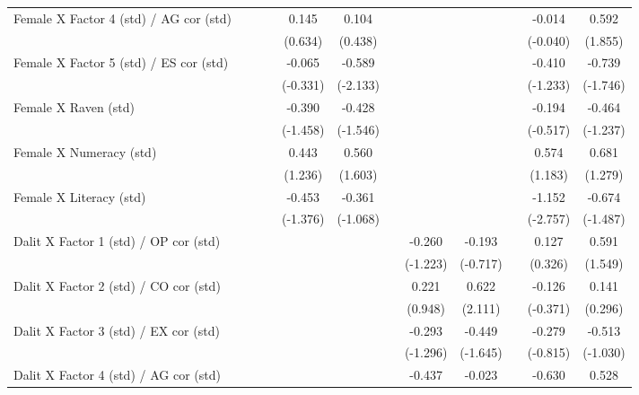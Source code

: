 {\begin{longtable}{@{\extracolsep{\fill}}lccccccccccc}
    Female X Factor 4 (std) / AG cor (std) &       &       &       & 0.145 & 0.104 &       &       &       &       & -0.014 & 0.592 \\
          &       &       &       & (0.634) & (0.438) &       &       &       &       & (-0.040) & (1.855) \\
    Female X Factor 5 (std) / ES cor (std) &       &       &       & -0.065 & -0.589 &       &       &       &       & -0.410 & -0.739 \\
          &       &       &       & (-0.331) & (-2.133) &       &       &       &       & (-1.233) & (-1.746) \\
    Female X Raven (std) &       &       &       & -0.390 & -0.428 &       &       &       &       & -0.194 & -0.464 \\
          &       &       &       & (-1.458) & (-1.546) &       &       &       &       & (-0.517) & (-1.237) \\
    Female X Numeracy (std) &       &       &       & 0.443 & 0.560 &       &       &       &       & 0.574 & 0.681 \\
          &       &       &       & (1.236) & (1.603) &       &       &       &       & (1.183) & (1.279) \\
    Female X Literacy (std) &       &       &       & -0.453 & -0.361 &       &       &       &       & -1.152 & -0.674 \\
          &       &       &       & (-1.376) & (-1.068) &       &       &       &       & (-2.757) & (-1.487) \\
    Dalit X Factor 1 (std) / OP cor (std) &       &       &       &       &       &       & -0.260 & -0.193 &       & 0.127 & 0.591 \\
          &       &       &       &       &       &       & (-1.223) & (-0.717) &       & (0.326) & (1.549) \\
    Dalit X Factor 2 (std) / CO cor (std) &       &       &       &       &       &       & 0.221 & 0.622 &       & -0.126 & 0.141 \\
          &       &       &       &       &       &       & (0.948) & (2.111) &       & (-0.371) & (0.296) \\
    Dalit X Factor 3 (std) / EX cor (std) &       &       &       &       &       &       & -0.293 & -0.449 &       & -0.279 & -0.513 \\
          &       &       &       &       &       &       & (-1.296) & (-1.645) &       & (-0.815) & (-1.030) \\
    Dalit X Factor 4 (std) / AG cor (std) &       &       &       &       &       &       & -0.437 & -0.023 &       & -0.630 & 0.528 \\

\end{longtable}}
